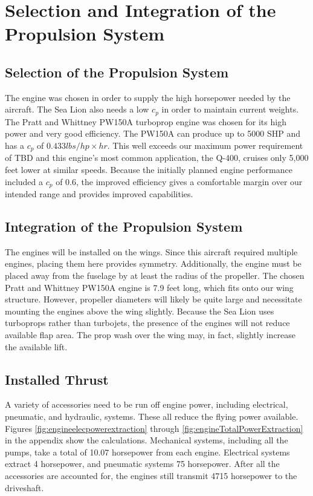 \documentclass[conf]{new-aiaa}
\begin{document}
\section{Selection and Integration of the Propulsion System}
\subsection{Selection of the Propulsion System}
The engine was chosen in order to supply the high horsepower needed by the aircraft. The Sea Lion also needs a low $c_p$ in order to maintain current weights. The Pratt and Whittney PW150A turboprop engine was chosen for its high power and very good efficiency. The PW150A can produce up to 5000 SHP and has a $c_p$ of $0.433 lbs/hp \times hr$. This well exceeds our maximum power requirement of TBD and this engine's most common application, the Q-400, cruises only 5,000 feet lower at similar speeds. \cite{PW150FuelFlow}
Because the initially planned engine performance included a $c_p$ of 0.6, the improved efficiency gives a comfortable margin over our intended range and provides improved capabilities.

\subsection{Integration of the Propulsion System}
The engines will be installed on the wings. Since this aircraft required multiple engines, placing 
them here provides symmetry. Additionally, the engine must be placed away from the fuselage by 
at least the radius of the propeller. The chosen Pratt and Whittney PW150A engine is 7.9 feet long, 
which fits onto our wing structure. However, propeller diameters will likely be quite large and necessitate mounting the engines above the wing slightly. Because the Sea Lion uses turboprops rather than turbojets, the presence of the engines will not reduce available flap area. The prop wash over the wing may, in fact, slightly increase the available lift.

\subsection{Installed Thrust}
A variety of accessories need to be run off engine power, including electrical, pneumatic, and hydraulic, systems. These all reduce the flying power available. Figures \ref{fig:engineelecpowerextraction} through \ref{fig:engineTotalPowerExtraction} in the appendix show the calculations. Mechanical systems, including all the pumps, take a total of 10.07 horsepower from each engine. Electrical systems extract 4 horsepower, and pneumatic systems 75 horsepower. After all the accessories are accounted for, the engines still transmit 4715 horsepower to the driveshaft. 
\end{document}
